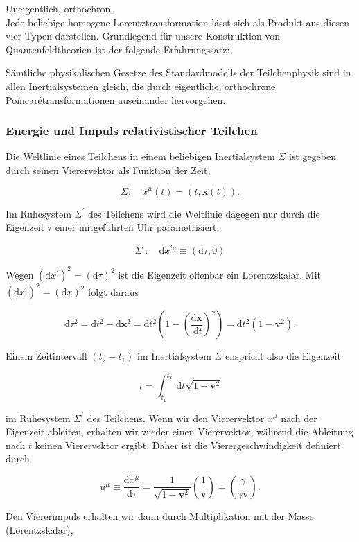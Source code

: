\documentclass[10pt, letterpaper]{article}
\begin{document}
Uneigentlich, orthochron.\\
Jede beliebige homogene Lorentztransformation lässt sich als Produkt aus diesen vier Typen darstellen. Grundlegend für unsere Konstruktion von Quantenfeldtheorien ist der folgende Erfahrungssatz:

Sämtliche physikalischen Gesetze des Standardmodells der Teilchenphysik sind in allen Inertialsystemen gleich, die durch eigentliche, orthochrone Poincarétransformationen auseinander hervorgehen.

\subsubsection*{Energie und Impuls relativistischer Teilchen}
Die Weltlinie eines Teilchens in einem beliebigen Inertialsystem $\Sigma$ ist gegeben durch seinen Vierervektor als Funktion der Zeit,

$$
\Sigma: \quad x^{\mu}(t)=(t, \mathbf{x}(t)) .
$$

Im Ruhesystem $\Sigma^{\prime}$ des Teilchens wird die Weltlinie dagegen nur durch die Eigenzeit $\tau$ einer mitgeführten Uhr parametrisiert,

$$
\Sigma^{\prime}: \quad \mathrm{d} x^{\prime \mu} \equiv(\mathrm{d} \tau, 0)
$$

Wegen $\left(\mathrm{d} x^{\prime}\right)^{2}=(\mathrm{d} \tau)^{2}$ ist die Eigenzeit offenbar ein Lorentzskalar. Mit $\left(\mathrm{d} x^{\prime}\right)^{2}= (\mathrm{d} x)^{2}$ folgt daraus

$$
\mathrm{d} \tau^{2}=\mathrm{d} t^{2}-\mathrm{d} \mathbf{x}^{2}=\mathrm{d} t^{2}\left(1-\left(\frac{\mathrm{d} \mathbf{x}}{\mathrm{~d} t}\right)^{2}\right)=\mathrm{d} t^{2}\left(1-\mathbf{v}^{2}\right) .
$$

Einem Zeitintervall $\left(t_{2}-t_{1}\right)$ im Inertialsystem $\Sigma$ enspricht also die Eigenzeit

$$
\tau=\int_{t_{1}}^{t_{2}} \mathrm{~d} t \sqrt{1-\mathbf{v}^{2}}
$$

im Ruhesystem $\Sigma^{\prime}$ des Teilchens. Wenn wir den Vierervektor $x^{\mu}$ nach der Eigenzeit ableiten, erhalten wir wieder einen Vierervektor, während die Ableitung nach $t$ keinen Vierervektor ergibt. Daher ist die Vierergeschwindigkeit definiert durch

$$
u^{\mu} \equiv \frac{\mathrm{d} x^{\mu}}{\mathrm{d} \tau}=\frac{1}{\sqrt{1-\mathbf{v}^{2}}}\binom{1}{\mathbf{v}}=\binom{\gamma}{\gamma \mathbf{v}} .
$$

Den Viererimpuls erhalten wir dann durch Multiplikation mit der Masse (Lorentzskalar),
\end{document}
